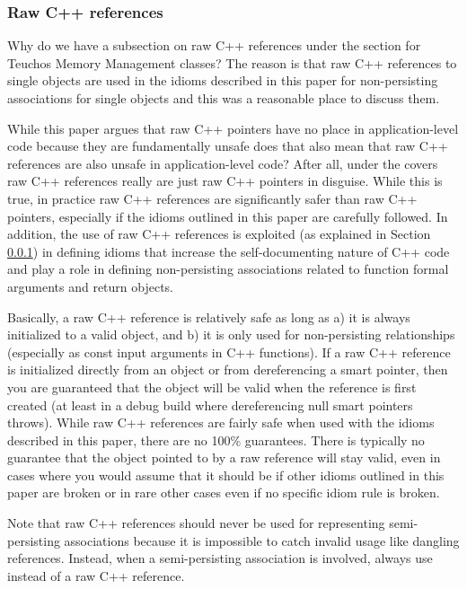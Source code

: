 \documentclass[pdf,ps2pdf,11pt]{SANDreport}
\begin{document}
%
{}\subsubsection{Raw C++ references}
\label{sec:raw-C++-references}
%

Why do we have a subsection on raw C++ references under the section
for Teuchos Memory Management classes?  The reason is that raw C++
references to single objects are used in the idioms described in this
paper for non-persisting associations for single objects and this was
a reasonable place to discuss them.

While this paper argues that raw C++ pointers have no place in
application-level code because they are fundamentally unsafe does that
also mean that raw C++ references are also unsafe in application-level
code?  After all, under the covers raw C++ references really are just
raw C++ pointers in disguise.  While this is true, in practice raw C++
references are significantly safer than raw C++ pointers, especially
if the idioms outlined in this paper are carefully followed.  In
addition, the use of raw C++ references is exploited (as explained in
Section {}\ref{sec:raw-C++-references}) in defining idioms that
increase the self-documenting nature of C++ code and play a role in
defining non-persisting associations related to function formal
arguments and return objects.

Basically, a raw C++ reference is relatively safe as long as a) it is
always initialized to a valid object, and b) it is only used for
non-persisting relationships (especially as const input arguments in
C++ functions).  If a raw C++ reference is initialized directly from an
object or from dereferencing a smart pointer, then you are guaranteed
that the object will be valid when the reference is first created (at
least in a debug build where dereferencing null smart pointers
throws).  While raw C++ references are fairly safe when used with the
idioms described in this paper, there are no 100\% guarantees.  There
is typically no guarantee that the object pointed to by a raw reference
will stay valid, even in cases where you would assume that it should
be if other idioms outlined in this paper are broken or in rare other
cases even if no specific idiom rule is broken.

Note that raw C++ references should never be used for representing
semi-persisting associations because it is impossible to catch invalid
usage like dangling references.  Instead, when a semi-persisting
association is involved, always use {} instead of a raw C++
reference.
\end{document}
